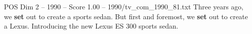 \begin{textsample}{POS Dim 2 – 1990 – Score 1.00 – 1990/tv\_com\_1990\_81.txt}  \label{ex:f2_pos_040}
Three years ago, we \textbf{set} out to create a sports sedan.
But first and foremost, we \textbf{set} out to create a Lexus.
Introducing the new Lexus ES 300 sports sedan.

\end{textsample}
